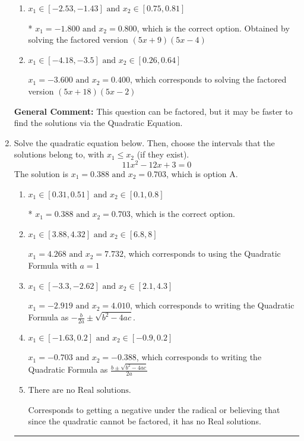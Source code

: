 \documentclass{extbook}[14pt]
\newcommand{\litem}[1]{\item #1

\rule{\textwidth}{0.4pt}}
\begin{document}
\begin{enumerate}
{\begin{enumerate}[label=\Alph*.]
$x_1 = -9.000 \text{ and } x_2 = 0.160$, which corresponds to solving the factored version $(x + 9)(25x -4)$
\item \( x_1 \in [-2.53, -1.43] \text{ and } x_2 \in [0.75, 0.81] \)

* $x_1 = -1.800 \text{ and } x_2 = 0.800$, which is the correct option. Obtained by solving the factored version $(5x + 9)(5x -4)$
\item \( x_1 \in [-4.18, -3.5] \text{ and } x_2 \in [0.26, 0.64] \)

$x_1 = -3.600 \text{ and } x_2 = 0.400$, which corresponds to solving the factored version $(5x + 18)(5x -2)$
\end{enumerate}

\textbf{General Comment:} This question can be factored, but it may be faster to find the solutions via the Quadratic Equation.
}
\litem{
Solve the quadratic equation below. Then, choose the intervals that the solutions belong to, with $x_1 \leq x_2$ (if they exist).
\[ 11x^{2} -12 x + 3 = 0 \]The solution is \( x_1 = 0.388 \text{ and } x_2 = 0.703 \), which is option A.\begin{enumerate}[label=\Alph*.]
\item \( x_1 \in [0.31, 0.51] \text{ and } x_2 \in [0.1, 0.8] \)

* $x_1 = 0.388 \text{ and } x_2 = 0.703$, which is the correct option.
\item \( x_1 \in [3.88, 4.32] \text{ and } x_2 \in [6.8, 8] \)

 $x_1 = 4.268 \text{ and } x_2 = 7.732$, which corresponds to using the Quadratic Formula with $a=1$
\item \( x_1 \in [-3.3, -2.62] \text{ and } x_2 \in [2.1, 4.3] \)

 $x_1 = -2.919 \text{ and } x_2 = 4.010$, which corresponds to writing the Quadratic Formula as $-\frac{b}{2a} \pm \sqrt{b^2 - 4ac}$.
\item \( x_1 \in [-1.63, 0.2] \text{ and } x_2 \in [-0.9, 0.2] \)

 $x_1 = -0.703 \text{ and } x_2 = -0.388$, which corresponds to writing the Quadratic Formula as $\frac{b \pm \sqrt{b^2 - 4ac}}{2a}$
\item \( \text{There are no Real solutions.} \)

Corresponds to getting a negative under the radical or believing that since the quadratic cannot be factored, it has no Real solutions.
\end{enumerate}

}
\end{enumerate}
\end{document}
